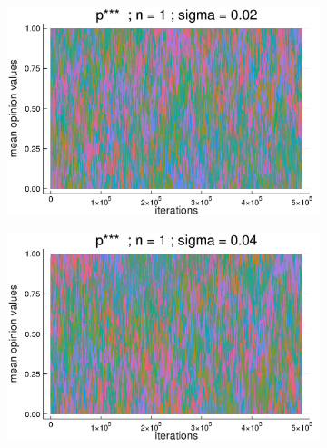 \documentclass{article}
\begin{document}
        \begin{figure}[H]
  \centering
    \begin{subfigure}[b]{0.45\textwidth}
      \includegraphics[width=\textwidth]{img/compare-ps/Poodlcalculatep***n1-rho005-sigma002-00intrans.png}
    \end{subfigure}
    \begin{subfigure}[b]{0.45\textwidth}
      \includegraphics[width=\textwidth]{img/compare-ps/Poodlcalculatep***n1-rho005-sigma004-00intrans.png}
     \end{subfigure}
     \begin{subfigure}[b]{0.5\textwidth}

\end{subfigure}
\end{figure}
\end{document}
